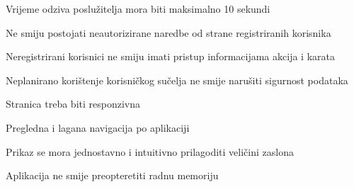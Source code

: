 			 \begin{packed_item}
			 	\item Vrijeme odziva poslužitelja mora biti maksimalno 10 sekundi
			 	\item Ne smiju postojati neautorizirane naredbe od strane registriranih korisnika
			 	\item Neregistrirani korisnici ne smiju imati pristup informacijama akcija i karata
			 	\item Neplanirano korištenje korisničkog sučelja ne smije narušiti sigurnost podataka
			 	\item Stranica treba biti responzivna
			 	\item Pregledna i lagana navigacija po aplikaciji
			 	\item Prikaz se mora jednostavno i intuitivno prilagoditi veličini zaslona
			 	\item Aplikacija ne smije preopteretiti radnu memoriju
			 \end{packed_item}
			 
			 
			 
	